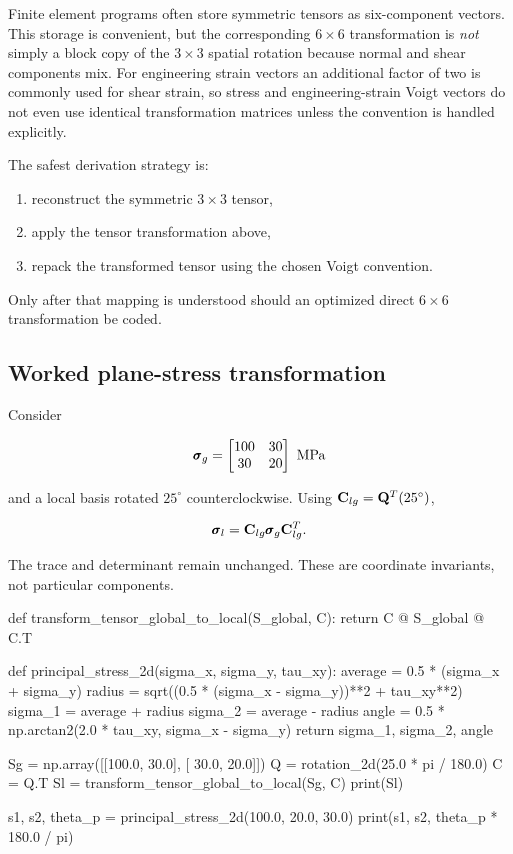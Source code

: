 Finite element programs often store symmetric tensors as six-component vectors.
This storage is convenient, but the corresponding $6\times6$ transformation is
\emph{not} simply a block copy of the $3\times3$ spatial rotation because normal
and shear components mix. For engineering strain vectors an additional factor of
two is commonly used for shear strain, so stress and engineering-strain Voigt
vectors do not even use identical transformation matrices unless the convention
is handled explicitly.

The safest derivation strategy is:

\begin{enumerate}
    \item reconstruct the symmetric $3\times3$ tensor,
    \item apply the tensor transformation above,
    \item repack the transformed tensor using the chosen Voigt convention.
\end{enumerate}

Only after that mapping is understood should an optimized direct $6\times6$
transformation be coded.

\subsection{Worked plane-stress transformation}

Consider

\begin{equation}
    \pmb{\sigma}_g
    =
    \begin{bmatrix}
    100&30\\
    30&20
    \end{bmatrix}\ \mathrm{MPa}
\end{equation}

and a local basis rotated $25^\circ$ counterclockwise. Using
$\mathbf{C}_{lg}=\mathbf{Q}^{T}(25^\circ)$,

\begin{equation}
    \pmb{\sigma}_l
    =\mathbf{C}_{lg}\pmb{\sigma}_g\mathbf{C}_{lg}^{T}.
\end{equation}

The trace and determinant remain unchanged. These are coordinate invariants,
not particular components.

\begin{python}
def transform_tensor_global_to_local(S_global, C):
    return C @ S_global @ C.T


def principal_stress_2d(sigma_x, sigma_y, tau_xy):
    average = 0.5 * (sigma_x + sigma_y)
    radius = sqrt((0.5 * (sigma_x - sigma_y))**2 + tau_xy**2)
    sigma_1 = average + radius
    sigma_2 = average - radius
    angle = 0.5 * np.arctan2(2.0 * tau_xy, sigma_x - sigma_y)
    return sigma_1, sigma_2, angle


Sg = np.array([[100.0, 30.0],
               [ 30.0, 20.0]])
Q = rotation_2d(25.0 * pi / 180.0)
C = Q.T
Sl = transform_tensor_global_to_local(Sg, C)
print(Sl)

s1, s2, theta_p = principal_stress_2d(100.0, 20.0, 30.0)
print(s1, s2, theta_p * 180.0 / pi)
\end{python}


